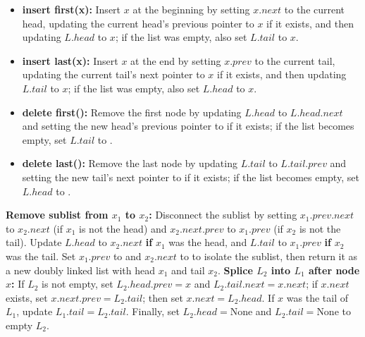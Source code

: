 \documentclass[12pt,twoside]{article}
\begin{document}
\begin{problems}
\begin{problemparts}
\problempart %
\begin{itemize}
    \item \textbf{insert first(x):} Insert $x$ at the beginning by setting $x.next$ to the current head, updating the current head's previous pointer to $x$ if it exists, and then updating $L.head$ to $x$; if the list was empty, also set $L.tail$ to $x$.
    \item \textbf{insert last(x):} Insert $x$ at the end by setting $x.prev$ to the current tail, updating the current tail's next pointer to $x$ if it exists, and then updating $L.tail$ to $x$; if the list was empty, also set $L.head$ to $x$.
    \item \textbf{delete first():} Remove the first node by updating $L.head$ to $L.head.next$ and setting the new head's previous pointer to  if it exists; if the list becomes empty, set $L.tail$ to .
    \item \textbf{delete last():} Remove the last node by updating $L.tail$ to $L.tail.prev$ and setting the new tail's next pointer to  if it exists; if the list becomes empty, set $L.head$ to .
\end{itemize}
\problempart %
\textbf{Remove sublist from $x_1$ to $x_2$:} Disconnect the sublist by setting $x_1.prev.next$ to $x_2.next$ (if $x_1$ is not the head) and $x_2.next.prev$ to $x_1.prev$ (if $x_2$ is not the tail). Update $L.head$ to $x_2.next$ \textbf{if} $x_1$ was the head, and $L.tail$ to $x_1.prev$ \textbf{if} $x_2$ was the tail. Set $x_1.prev$ to  and $x_2.next$ to  to isolate the sublist, then return it as a new doubly linked list with head $x_1$ and tail $x_2$.
\problempart %
\textbf{Splice $L_2$ into $L_1$ after node $x$:} If $L_2$ is not empty, set $L_2.head.prev = x$ and $L_2.tail.next = x.next$; if $x.next$ exists, set $x.next.prev = L_2.tail$; then set $x.next = L_2.head$. If $x$ was the tail of $L_1$, update $L_1.tail = L_2.tail$. Finally, set $L_2.head = \text{None}$ and $L_2.tail = \text{None}$ to empty $L_2$.
\end{problemparts}

\end{problems}
\end{document}
